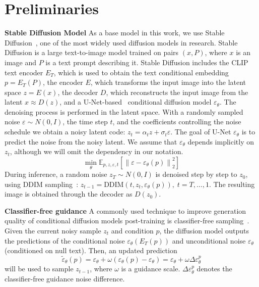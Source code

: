 \section{Preliminaries}
\textbf{Stable Diffusion Model} As a base model in this work, we use Stable Diffusion~\citep{stablediffusion}, one of the most widely used diffusion models in research. Stable Diffusion is a large text-to-image model trained on pairs $(x, P)$, where $x$ is an image and $P$ is a text prompt describing it. Stable Diffusion includes the CLIP~\citep{clip} text encoder $E_T$, which is used to obtain the text conditional embedding $p = E_T(P)$, the encoder $E$, which transforms the input image into the latent space $z = E(x)$, the decoder $D$, which reconstructs the input image from the latent $x \approx D(z)$, and a U-Net-based~\citep{unet} conditional diffusion model $\varepsilon_{\theta}$. The denoising process is performed in the latent space. With a randomly sampled noise $\varepsilon \sim N(0,I)$, the time step $t$, and the coefficients controlling the noise schedule we obtain a noisy latent code: $z_t = \alpha_t z + \sigma_t \varepsilon$. The goal of U-Net $\varepsilon_{\theta}$ is to predict the noise from the noisy latent. We assume that $\varepsilon_{\theta}$ depends implicitly on $z_{t}$, although we will omit the dependency in our notation.
\begin{equation}\label{eq:training}
\min_\theta \mathbb{E}_{p, z, \varepsilon, t}\left[\left\|\varepsilon-\varepsilon_\theta(p)\right\|_2^2\right]
\end{equation}
During inference, a random noise $z_T \sim N(0,I)$ is denoised step by step to $z_0$, using DDIM sampling~\cite{ddim}:
$z_{t-1}=\text{DDIM}(t, z_t, \varepsilon_\theta(p)), \; t = T, \dots, 1$. The resulting image is obtained through the decoder as $D(z_0)$. 

\textbf{Classifier-free guidance} A commonly used technique to improve generation quality of conditional diffusion models post-training is classifier-free sampling~\citep{classfree}. Given the current noisy sample $z_t$ and condition $p$, the diffusion model outputs the predictions of the conditional noise $\varepsilon_{\theta}(E_T(p))$ and unconditional noise $\varepsilon_{\theta}$ (conditioned on null text). Then, an updated prediction
\begin{equation}\label{eq:sampling}
\tilde{\varepsilon}_{\theta}(p) = \varepsilon_{\theta} + \omega( \varepsilon_{\theta}(p) - \varepsilon_{\theta}) = \varepsilon_{\theta} + \omega \Delta \varepsilon_{\theta}^{p}
\end{equation}
will be used to sample $z_{t-1}$, where $\omega$ is a guidance scale. $\Delta\varepsilon_{\theta}^{p}$ denotes the classifier-free guidance noise difference.


